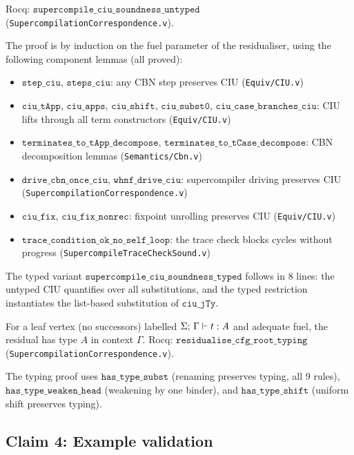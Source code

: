 \noindent Rocq: $\texttt{supercompile\_ciu\_soundness\_untyped}$ (\texttt{SupercompilationCorrespondence.v}).

The proof is by induction on the fuel parameter of the residualiser, using the following component lemmas (all proved):
\begin{itemize}[leftmargin=*,nosep]
\item $\texttt{step\_ciu}$, $\texttt{steps\_ciu}$: any CBN step preserves CIU (\texttt{Equiv/CIU.v})
\item $\texttt{ciu\_tApp}$, $\texttt{ciu\_apps}$, $\texttt{ciu\_shift}$, $\texttt{ciu\_subst0}$, $\texttt{ciu\_case\_branches\_ciu}$: CIU lifts through all term constructors (\texttt{Equiv/CIU.v})
\item $\texttt{terminates\_to\_tApp\_decompose}$, $\texttt{terminates\_to\_tCase\_decompose}$: CBN decomposition lemmas (\texttt{Semantics/Cbn.v})
\item $\texttt{drive\_cbn\_once\_ciu}$, $\texttt{whnf\_drive\_ciu}$: supercompiler driving preserves CIU (\texttt{SupercompilationCorrespondence.v})
\item $\texttt{ciu\_fix}$, $\texttt{ciu\_fix\_nonrec}$: fixpoint unrolling preserves CIU (\texttt{Equiv/CIU.v})
\item $\texttt{trace\_condition\_ok\_no\_self\_loop}$: the trace check blocks cycles without progress (\texttt{SupercompileTraceCheckSound.v})
\end{itemize}

The typed variant $\texttt{supercompile\_ciu\_soundness\_typed}$ follows in 8 lines: the untyped CIU quantifies over all substitutions, and the typed restriction instantiates the list-based substitution of $\texttt{ciu\_jTy}$.

\begin{theorem}
\label{thm:mech-typing}
For a leaf vertex (no successors) labelled $\Sigma;\,\Gamma \vdash t : A$ and adequate fuel, the residual has type $A$ in context $\Gamma$.
\newline Rocq: $\texttt{residualise\_cfg\_root\_typing}$ (\texttt{SupercompilationCorrespondence.v}).
\end{theorem}

 The typing proof uses $\texttt{has\_type\_subst}$ (renaming preserves typing, all 9 rules), $\texttt{has\_type\_weaken\_head}$ (weakening by one binder), and $\texttt{has\_type\_shift}$ (uniform shift preserves typing).

\subsection{Claim 4: Example validation}

